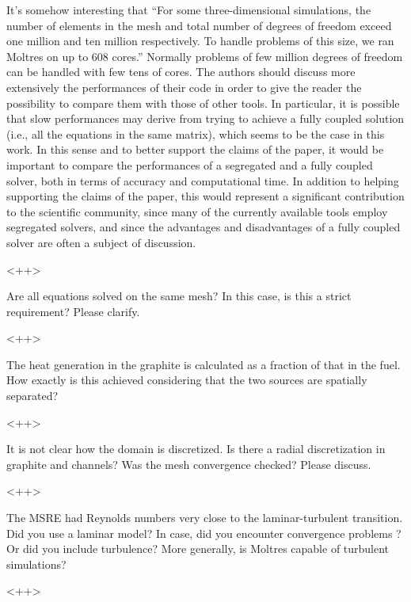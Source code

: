 \documentclass[answers,11pt]{exam}
\begin{document}
\begin{questions}
\question It's somehow interesting that ``For some three-dimensional 
simulations, the number of elements in the mesh and total number of degrees of 
freedom exceed one million and ten million respectively. To handle problems of 
this size, we ran Moltres on up to 608 cores.'' Normally problems of few million degrees of freedom can be handled with few tens of cores. The authors should discuss more extensively the performances of their code in order to give the reader the possibility to compare them with those of other tools. In particular, it is possible that slow performances may derive from trying to achieve a fully coupled solution (i.e., all the equations in the same matrix), which seems to be the case in this work. In this sense and to better support the claims of the paper, it would be important to compare the performances of a segregated and a fully coupled  solver, both in terms of accuracy and computational time. In addition to helping supporting the claims of the paper, this
would represent a significant contribution to the scientific community, since many of the currently available tools employ segregated solvers, and since the advantages and disadvantages of a fully coupled solver are often a subject of discussion.
\begin{solution}
        <++>
\end{solution}


\question Are all equations solved on the same mesh? In this case, is this a strict requirement? Please clarify.
\begin{solution}
        <++>
\end{solution}

\question The heat generation in the graphite is calculated as a fraction of that in the fuel. How exactly is this achieved considering that the two sources are spatially separated?
\begin{solution}
        <++>
\end{solution}

\question It is not clear how the domain is discretized. Is there a radial discretization in graphite and channels? Was the mesh convergence checked? Please discuss.
\begin{solution}
        <++>
\end{solution}

\question The MSRE had Reynolds numbers very close to the laminar-turbulent transition. Did you use a laminar model? In case, did you encounter convergence problems ?
Or did you include turbulence? More generally, is Moltres capable of turbulent simulations?
\begin{solution}
        <++>
\end{solution}


\end{questions}
\end{document}
